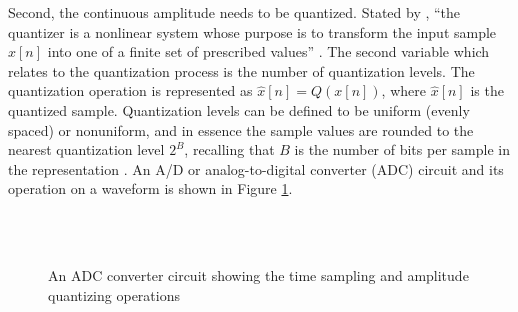 \documentclass[report.tex]{subfiles}
\begin{document}
Second, the continuous amplitude needs to be quantized. Stated by \citeauthor{discretebook}, ``the quantizer is a nonlinear system whose purpose is to transform the input sample $x[n]$ into one of a finite set of prescribed values'' \parencite[190]{discretebook}. The second variable which relates to the quantization process is the number of quantization levels. The quantization operation is represented as $ \hat{x}[n] = Q(x[n])$, where $\hat{x}[n]$ is the quantized sample. Quantization levels can be defined to be uniform (evenly spaced) or nonuniform, and in essence the sample values are rounded to the nearest quantization level $2^{B}$, recalling that $B$ is the number of bits per sample in the representation \parencite{discretebook}. An A/D or analog-to-digital converter (ADC) circuit and its operation on a waveform is shown in Figure \ref{fig:adccircuit}.

\begin{figure}[ht]
	\centering
	\hspace{0.1em}
	\\
	\vspace{0.1em}
	\\
	\caption{An ADC converter circuit showing the time sampling and amplitude quantizing operations \parencite[188, 190, 192]{discretebook}}
	\label{fig:adccircuit}
\end{figure}
\end{document}

